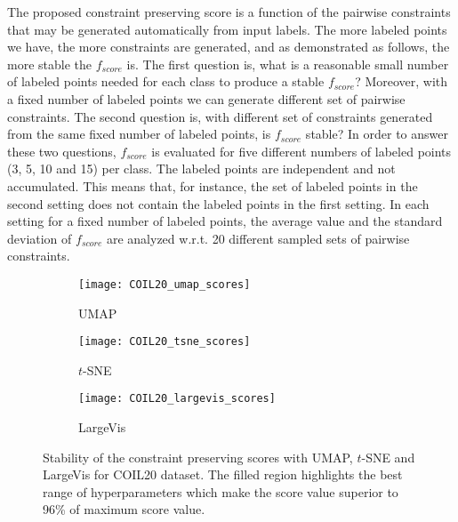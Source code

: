 The proposed constraint preserving score is a function of the pairwise constraints that may be generated automatically from input labels.
The more labeled points we have, the more constraints are generated, and as demonstrated as follows, the more stable the $f_{score}$ is.
The first question is, what is a reasonable small number of labeled points needed for each class to produce a stable $f_{score}$?
Moreover, with a fixed number of labeled points we can generate different set of pairwise constraints.
The second question is, with different set of constraints generated from the same fixed number of labeled points, is $f_{score}$ stable?
In order to answer these two questions, $f_{score}$ is evaluated for five different numbers of labeled points (3, 5, 10 and 15) per class.
The labeled points are independent and not accumulated.
This means that, for instance, the set of labeled points in the second setting does not contain the labeled points in the first setting.
In each setting for a fixed number of labeled points, the average value and the standard deviation of $f_{score}$ are analyzed w.r.t. 20 different sampled sets of pairwise constraints.

\begin{figure}%
\begin{subfigure}[b]{0.32\linewidth}
     \centering
     \texttt{[image: COIL20\_umap\_scores]}
     \caption{UMAP}
\end{subfigure}
\hfill
\begin{subfigure}[b]{0.32\linewidth}
     \centering
     \texttt{[image: COIL20\_tsne\_scores]}
     \caption{$t$-SNE}
\end{subfigure}
\hfill
\begin{subfigure}[b]{0.32\linewidth}
     \centering
     \texttt{[image: COIL20\_largevis\_scores]}
     \caption{LargeVis}
\end{subfigure}
\caption{Stability of the constraint preserving scores with UMAP, $t$-SNE and LargeVis for COIL20 dataset.
The filled region highlights the best range of hyperparameters which make the score value superior to 96\% of maximum score value.}
\label{fig:score:stability:COIL20}
\end{figure}


